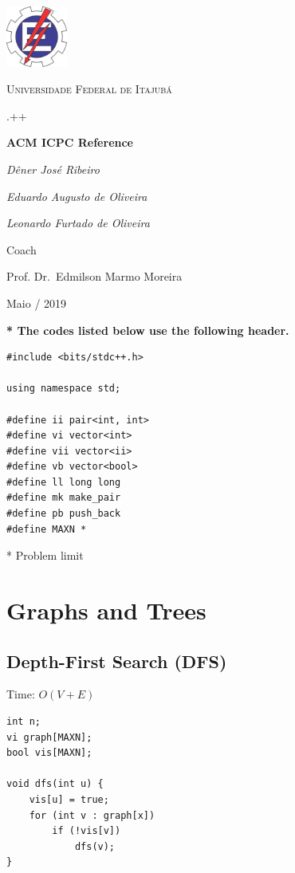 \documentclass[oneside]{article}
\begin{document}
\begin{titlepage}
  \centering
  \includegraphics[width=0.15\textwidth]{logo.png}\par\vspace{1cm}
  {\scshape\LARGE Universidade Federal de Itajubá \par}
  \vspace{1cm}
  {\scshape\Large .++\par}
  \vspace{1.5cm}
  {\huge\bfseries ACM ICPC Reference\par}
  \vspace{2cm}
  {\Large\itshape Dêner José Ribeiro\par}
  {\Large\itshape Eduardo Augusto de Oliveira\par}
  {\Large\itshape Leonardo Furtado de Oliveira\par}
  \vfill
  Coach\par
  Prof. Dr.~Edmilson Marmo Moreira
  
  \vfill
  
  {\large Maio / 2019\par}
\end{titlepage}

\thispagestyle{empty}
\tableofcontents
\pagebreak

\textbf{* The codes listed below use the following header.}
\begin{lstlisting}
#include <bits/stdc++.h>

using namespace std;

#define ii pair<int, int>
#define vi vector<int>
#define vii vector<ii>
#define vb vector<bool>
#define ll long long
#define mk make_pair
#define pb push_back
#define MAXN *
\end{lstlisting}
* Problem limit

\section{Graphs and Trees}

\subsection{Depth-First Search (DFS)}
Time: $O(V + E)$
\begin{lstlisting}
int n;
vi graph[MAXN];
bool vis[MAXN];

void dfs(int u) {
    vis[u] = true;
    for (int v : graph[x])
    	if (!vis[v])
    		dfs(v);
}
\end{lstlisting}
\end{document}
